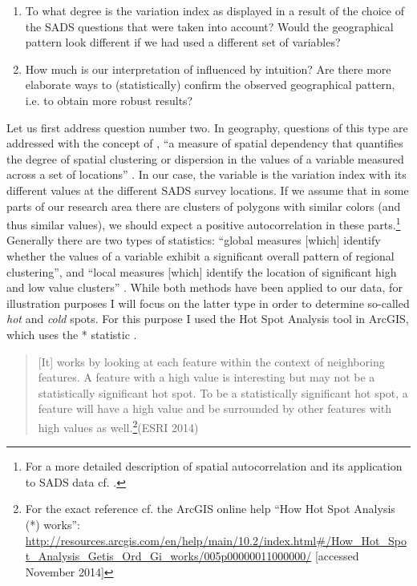 \documentclass[output=paper]{LSP/langsci}
\begin{document}
\begin{enumerate}
\item To what degree is the variation index as displayed in  a result of the choice of the SADS questions that were taken into account? Would the geographical pattern look different if we had used a different set of variables?
\item How much is our interpretation of  influenced by intuition? Are there more elaborate ways to (statistically) confirm the observed geographical pattern, i.e. to obtain more robust results?
\end{enumerate}

Let us first address question number two. In geography, questions of this type are addressed with the concept of , “a measure of spatial dependency that quantifies the degree of spatial clustering or dispersion in the values of a variable measured across a set of locations” \citep[34]{grieve_use_2011}. In our case, the variable is the variation index with its different values at the different SADS survey locations. If we assume that in some parts of our research area there are clusters of polygons with similar colors (and thus similar values), we should expect a positive autocorrelation in these parts.\footnote{For a more detailed description of spatial autocorrelation and its application to SADS data cf. \citet[62--63]{sibler_visualisierung_2011}.} Generally there are two types of  statistics: “global measures [which] identify whether the values of a variable exhibit a significant overall pattern of regional clustering”, and “local measures [which] identify the location of significant high and low value clusters” \citep[34]{grieve_use_2011}. While both methods have been applied to our data, for illustration purposes I will focus on the latter type in order to determine so-called \emph{hot} and \emph{cold} spots. For this purpose I used the Hot Spot Analysis tool in ArcGIS, which uses the * statistic \citep{getis_analysis_1992}.

\begin{quote}[It] works by looking at each feature within the context of neighboring features. A feature with a high value is interesting but may not be a statistically significant hot spot. To be a statistically significant hot spot, a feature will have a high value and be surrounded by other features with high values as well.\footnote{For the exact reference cf. the ArcGIS online help “How Hot Spot Analysis (*) works”: \url{http://resources.arcgis.com/en/help/main/10.2/index.html\#/How\_Hot\_Spot\_Analysis\_Getis\_Ord\_Gi\_works/005p00000011000000/} [accessed November 2014]}(ESRI 2014)
\end{quote}
\end{document}
